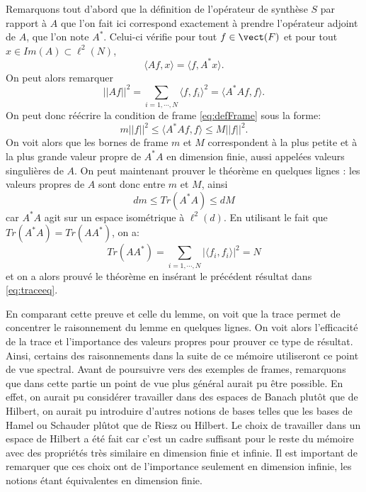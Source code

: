 	\begin{preuve}
		Remarquons tout d'abord que la définition de l'opérateur de synthèse $S$ par rapport à $A$ que l'on fait ici correspond exactement à prendre l'opérateur adjoint de $A$, que l'on note $A^*$.
		Celui-ci vérifie pour tout $f\in \vect(F)$ et pour tout $x\in Im(A) \subset \ell^2(N)$,
		\begin{equation}
			\langle Af, x \rangle = \langle f, A^*x \rangle.
		\end{equation}
		On peut alors remarquer
		\begin{equation}
			||Af||^2 = \sum_{i=1, \cdots,N} \langle f, f_i \rangle^2 = \langle A^*Af, f\rangle.
		\end{equation}
		On peut donc réécrire la condition de frame \ref{eq:defFrame} sous la forme:
		\begin{equation}
			m||f||^2 \leq \langle A^*Af, f\rangle \leq M||f||^2.
		\end{equation}
		On voit alors que les bornes de frame $m$ et $M$ correspondent à la plus petite et à la plus grande valeur propre de $A^*A$ en dimension finie, aussi appelées valeurs singulières de $A$.
		\newline
		On peut maintenant prouver le théorème en quelques lignes : les valeurs propres de $A$ sont donc entre $m$ et $M$, ainsi
		\begin{equation}\label{eq:traceeq}
			dm \leq Tr(A^*A) \leq dM
		\end{equation}
		car $A^*A$ agit sur un espace isométrique à $\ell^2(d)$.
		En utilisant le fait que $Tr(A^*A) = Tr(AA^*)$, on a:
		\begin{equation}
			Tr(AA^*) = \sum_{i=1,\cdots, N} |\langle f_i, f_i \rangle|^2 = N
		\end{equation}
		et on a alors prouvé le théorème en insérant le précédent résultat dans \ref{eq:traceeq}.  	
	\end{preuve}	
	En comparant cette preuve et celle du lemme, on voit que la trace permet de concentrer le raisonnement du lemme en quelques lignes.
	On voit alors l'efficacité de la trace et l'importance des valeurs propres pour prouver ce type de résultat.
	Ainsi, certains des raisonnements dans la suite de ce mémoire utiliseront ce point de vue spectral.
	\newline
	Avant de poursuivre vers des exemples de frames, remarquons que dans cette partie un point de vue plus général aurait pu être possible.
	En effet, on aurait pu considérer travailler dans des espaces de Banach plutôt que de Hilbert, on aurait pu introduire d'autres notions de bases telles que les bases de Hamel ou Schauder plûtot que de Riesz ou Hilbert.
	Le choix de travailler dans un espace de Hilbert a été fait car c'est un cadre suffisant pour le reste du mémoire avec des propriétés très similaire en dimension finie et infinie.
	Il est important de remarquer que ces choix ont de l'importance seulement en dimension infinie, les notions étant équivalentes en dimension finie.

